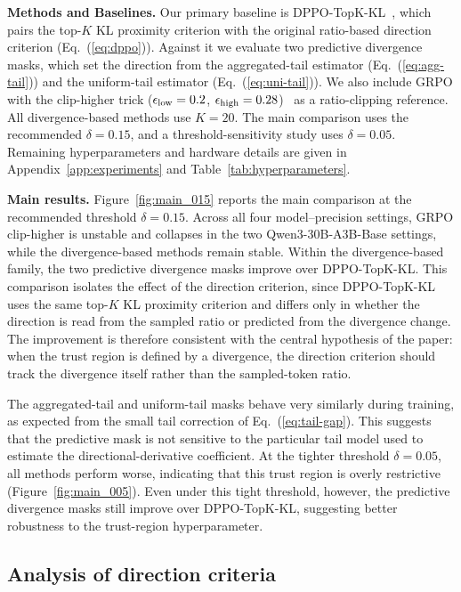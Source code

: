 \noindent\textbf{Methods and Baselines.}
Our primary baseline is DPPO-TopK-KL~\citep{dppo}, which pairs the top-$K$ KL proximity criterion with the original ratio-based direction criterion (Eq.~(\ref{eq:dppo})).
Against it we evaluate two predictive divergence masks, which set the direction from the aggregated-tail estimator (Eq.~(\ref{eq:agg-tail})) and the uniform-tail estimator (Eq.~(\ref{eq:uni-tail})).
We also include GRPO with the clip-higher trick (${\epsilon}_{\mathrm{low}}=0.2$,
${\epsilon}_{\mathrm{high}}=0.28$)~\citep{yu2025dapo} as a ratio-clipping reference. 
All divergence-based methods use $K=20$.
The main comparison uses the recommended $\delta=0.15$, and a threshold-sensitivity study uses $\delta=0.05$. 
Remaining hyperparameters and hardware details are given in Appendix~\ref{app:experiments} and Table~\ref{tab:hyperparameters}.



\noindent\textbf{Main results.}
Figure~\ref{fig:main_015} reports the main comparison at the recommended
threshold $\delta=0.15$.
Across all four model--precision settings, GRPO clip-higher is unstable and
collapses in the two Qwen3-30B-A3B-Base settings, while the divergence-based
methods remain stable.
Within the divergence-based family, the two predictive divergence masks improve over DPPO-TopK-KL.
This comparison isolates the effect of the direction criterion, since DPPO-TopK-KL uses the same top-$K$ KL proximity criterion and differs only in whether the direction is read from the sampled ratio or predicted from the divergence change.
The improvement is therefore consistent with the central hypothesis of the paper:
when the trust region is defined by a divergence, the direction criterion should track the divergence itself rather than the sampled-token ratio.

The aggregated-tail and uniform-tail masks behave very similarly during
training, as expected from the small tail correction of Eq.~(\ref{eq:tail-gap}).
This suggests that the predictive mask is not sensitive to the particular tail
model used to estimate the directional-derivative coefficient.
At the tighter threshold $\delta=0.05$, all methods perform worse, indicating
that this trust region is overly restrictive (Figure~\ref{fig:main_005}).
Even under this tight threshold, however, the predictive divergence masks still
improve over DPPO-TopK-KL, suggesting better robustness to the trust-region
hyperparameter.

\subsection{Analysis of direction criteria}
\label{sec:direction_analysis}

